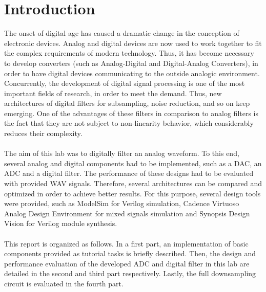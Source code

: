 \chapter*{Introduction}

The onset of digital age has caused a dramatic change in the conception of electronic devices. Analog and digital devices are now used to work together to fit the complex requirements of modern technology. Thus, it has become necessary to develop converters (such as Analog-Digital and Digital-Analog Converters), in order to have digital devices communicating to the outside analogic environment.\\
Concurrently, the development of digital signal processing is one of the most important fields of research, in order to meet the demand. Thus, new architectures of digital filters for subsampling, noise reduction, and so on keep emerging. One of the advantages of these filters in comparison to analog filters is the fact that they are not subject to non-linearity behavior, which considerably reduces their complexity.\\
\\
The aim of this lab was to digitally filter an analog waveform. To this end, several analog and digital components had to be implemented, such as a DAC, an ADC and a digital filter. The performance of these designs had to be evaluated with provided WAV signals. Therefore, several architectures can be compared and optimized in order to achieve better results. For this purpose, several design tools were provided, such as ModelSim for Verilog simulation, Cadence Virtuoso Analog Design Environment for mixed signals simulation and Synopsis Design Vision for Verilog module synthesis.\\
\\
This report is organized as follows. In a first part, an implementation of basic components provided as tutorial tasks is briefly described. Then, the design and performance evaluation of the developed ADC and digital filter in this lab are detailed in the second and third part respectively. Lastly, the full downsampling circuit is evaluated in the fourth part.
